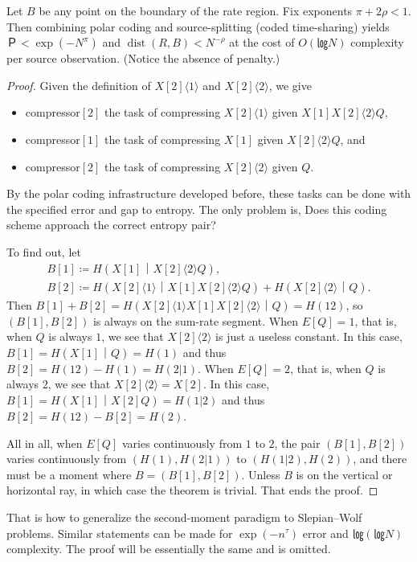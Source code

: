 \documentclass[openany]{amsbook}
\numberwithin{equation}{chapter}
\numberwithin{figure}{chapter}
\numberwithin{table}{chapter}
\DeclareMathOperator\dist{dist}
\theoremstyle{definition}	理dfn:Definition~?s			理exa:Example~?s
\theoremstyle{remark}		理cla:Claim~?s				理rem:Remark~?s
\begin{document}
	\begin{thm}
		Let $B$ be any point on the boundary of the rate region.
		Fix exponents $π+2ρ<1$.
		Then combining polar coding and source-splitting (coded time-sharing)
		yields $Ｐ<\exp(-N^π)$ and $\dist(R,B)<N^{-ρ}$
		at the cost of $O(㏒N)$ complexity per source observation.
		(Notice the absence of penalty.)
	\end{thm}
	
	\begin{proof}
		Given the definition of $X[2]⟨1⟩$ and $X[2]⟨2⟩$, we give
		\begin{itemize}
			\item	compressor$[2]$ the task of compressing
					$X[2]⟨1⟩$ given $X[1]X[2]⟨2⟩Q$,
			\item	compressor$[1]$ the task of compressing
					$X[1]$ given $X[2]⟨2⟩Q$, and
			\item	compressor$[2]$ the task of compressing
					$X[2]⟨2⟩$ given $Q$.
		\end{itemize}
		By the polar coding infrastructure developed before,
		these tasks can be done with the specified error and gap to entropy.
		The only problem is, Does this coding scheme approach the correct entropy pair?
		
		To find out, let
		\begin{gather*}
			B[1]≔H(X[1]｜X[2]⟨2⟩Q),	\\
			B[2]≔H(X[2]⟨1⟩｜X[1]X[2]⟨2⟩Q)+H(X[2]⟨2⟩｜Q).
		\end{gather*}
		Then $B[1]+B[2]=H(X[2]⟨1⟩X[1]X[2]⟨2⟩｜Q)=H(12)$,
		so $(B[1],B[2])$ is always on the sum-rate segment.
		When $E[Q]=1$, that is, when $Q$ is always $1$,
		we see that $X[2]⟨2⟩$ is just a useless constant.
		In this case, $B[1]=H(X[1]｜Q)=H(1)$ and thus $B[2]=H(12)-H(1)=H(2|1)$.
		When $E[Q]=2$, that is, when $Q$ is always $2$,
		we see that $X[2]⟨2⟩=X[2]$.
		In this case, $B[1]=H(X[1]｜X[2]Q)=H(1|2)$ and thus $B[2]=H(12)-B[2]=H(2)$.
		
		All in all, when $E[Q]$ varies continuously from $1$ to $2$,
		the pair $(B[1],B[2])$ varies continuously from $(H(1),H(2|1))$ to
		$(H(1|2),H(2))$, and there must be a moment where $B=(B[1],B[2])$.
		Unless $B$ is on the vertical or horizontal ray,
		in which case the theorem is trivial.
		That ends the proof.
	\end{proof}
	
	That is how to generalize the second-moment paradigm to Slepian--Wolf problems.
	Similar statements can be made for $\exp(-n^τ)$ error and $㏒(㏒N)$ complexity.
	The proof will be essentially the same and is omitted.
	
\end{document}
